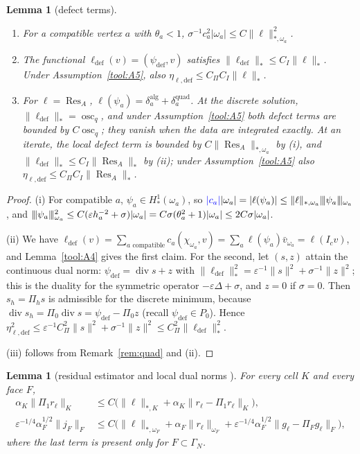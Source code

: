 \documentclass[11pt]{article}
\newcommand{\rev}[1]{\textcolor{blue}{#1}}
\newcommand{\tnorm}[1]{\lvert\kern-0.25ex\lvert\kern-0.25ex\lvert #1\rvert\kern-0.25ex\rvert\kern-0.25ex\rvert}
\newcommand{\eps}{\varepsilon}
\newcommand{\Res}{\operatorname{Res}}
\newcommand{\osc}{\operatorname{osc}}
\newcommand{\dv}{\operatorname{div}}
\newcommand{\defe}{\mathrm{def}}
\theoremstyle{plain}
\newtheorem{lemma}[theorem]{Lemma}
\theoremstyle{remark}
\numberwithin{equation}{section}
\begin{document}
\begin{lemma}[defect terms]\label{lem:H}
\leavevmode
\begin{enumerate}[label=(\roman*)]
  \item For a compatible vertex $a$ with $\theta_a<1$,
  $\sigma^{-1}c_a^2|\omega_a|\le C\|\ell\|_{*,\omega_a}^2$.
  \item The functional $\ell_\defe(v)=(\psi_\defe,v)$ satisfies $\|\ell_\defe\|_*\le C_I\|\ell\|_*$.
  Under Assumption~\ref{tool:A5}, also $\eta_{\ell,\defe}\le C_\Pi C_I\|\ell\|_*$.
  \item For $\ell=\Res_A$, $\ell(\psi_a)=\delta_a^{\mathrm{alg}}+\delta_a^{\mathrm{quad}}$. At the
  discrete solution, $\|\ell_\defe\|_*=\osc_q$, and under Assumption~\ref{tool:A5} both defect
  terms are bounded by $C\osc_q$; they vanish when the data are integrated exactly. At an iterate,
  the local defect term is bounded by $C\|\Res_A\|_{*,\omega_a}$ by (i), and
  $\|\ell_\defe\|_*\le C_I\|\Res_A\|_*$ by (ii); under Assumption~\ref{tool:A5} also
  $\eta_{\ell,\defe}\le C_\Pi C_I\|\Res_A\|_*$.
\end{enumerate}
\end{lemma}

\begin{proof}
(i) For compatible $a$, $\psi_a\in H^1_*(\omega_a)$, so
$\rev{|c_a|}|\omega_a|=|\ell(\psi_a)|\le\|\ell\|_{*,\omega_a}\tnorm{\psi_a}_{\omega_a}$, and
$\tnorm{\psi_a}_{\omega_a}^2\le C(\eps h_a^{-2}+\sigma)|\omega_a|=C\sigma(\theta_a^2+1)|\omega_a|
\le2C\sigma|\omega_a|$.

(ii) We have
$\ell_\defe(v)=\sum_{a\text{ compatible}}c_a(\chi_{\omega_a},v)=\sum_a\ell(\psi_a)\bar v_{\omega_a}=\ell(I_cv)$,
and Lemma~\ref{tool:A4} gives the first claim. For the second, let $(s,z)$ attain the continuous dual
norm: $\psi_\defe=\dv s+z$ with $\|\ell_\defe\|_*^2=\eps^{-1}\|s\|^2+\sigma^{-1}\|z\|^2$; this is the
duality for the symmetric operator $-\eps\Delta+\sigma$, and $z=0$ if $\sigma=0$. Then $s_h=\Pi_hs$ is
admissible for the discrete minimum, because $\dv s_h=\Pi_0\dv s=\psi_\defe-\Pi_0z$ (recall
$\psi_\defe\in P_0$). Hence
$\eta_{\ell,\defe}^2\le\eps^{-1}C_\Pi^2\|s\|^2+\sigma^{-1}\|z\|^2\le C_\Pi^2\|\ell_\defe\|_*^2$.

(iii) follows from Remark~\ref{rem:quad} and (ii).
\end{proof}

\begin{lemma}[residual estimator and local dual norms {\cite[proof of Thm.~4.1]{V05}}]\label{lem:D}
For every cell $K$ and every face $F$,
\begin{align*}
  \alpha_K\|\Pi_1r_\ell\|_K &\le C\bigl(\|\ell\|_{*,K}+\alpha_K\|r_\ell-\Pi_1r_\ell\|_K\bigr),\\
  \eps^{-1/4}\alpha_F^{1/2}\|j_F\|_F &\le C\bigl(\|\ell\|_{*,\omega_F}+\alpha_F\|r_\ell\|_{\omega_F}
  +\eps^{-1/4}\alpha_F^{1/2}\|g_\ell-\Pi_Fg_\ell\|_F\bigr),
\end{align*}
where the last term is present only for $F\subset\Gamma_N$.
\end{lemma}
\end{document}

